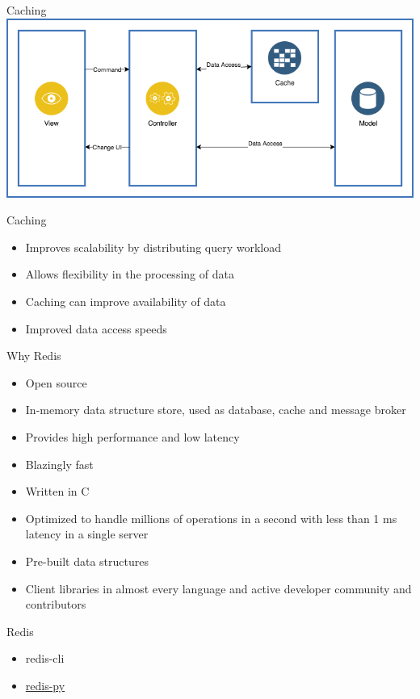 \documentclass[10pt]{beamer}
\begin{document}
\begin{frame}[fragile]{Caching}
  \includegraphics[scale=0.4]{img/mvc-cache}
\end{frame}

\begin{frame}[fragile]{Caching}
  \begin{itemize}
    \item Improves scalability by distributing query workload
    \item Allows flexibility in the processing of data
    \item Caching can improve availability of data
    \item Improved data access speeds
  \end{itemize}
\end{frame}

\begin{frame}[fragile]{Why Redis}
  \begin{itemize}
    \item Open source
    \item In-memory data structure store, used as database, cache and message
    broker
    \item Provides high performance and low latency
    \item Blazingly fast
    \item Written in C
    \item Optimized to handle millions of operations in a second with less than
    1 ms latency in a single server
    \item Pre-built data structures
    \item Client libraries in almost every language and active developer
    community and contributors
  \end{itemize}
\end{frame}

\begin{frame}[fragile]{Redis}
  \begin{itemize}
    \item redis-cli
    \item \href{https://github.com/andymccurdy/redis-py}{redis-py}
  \end{itemize}

\end{frame}
\end{document}
